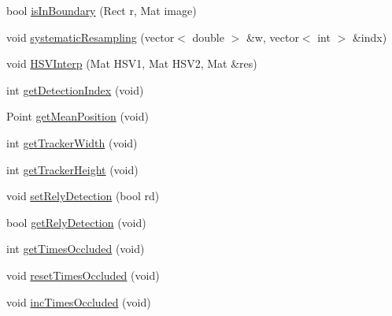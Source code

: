 \begin{DoxyCompactItemize}
\item 
bool \hyperlink{classParticleFilter_a6a0dc76f01919eb2eced75ba0092d69d}{is\-In\-Boundary} (Rect r, Mat image)
\item 
void \hyperlink{classParticleFilter_a3586ef733bc68c6c7c56379ac018a486}{systematic\-Resampling} (vector$<$ double $>$ \&w, vector$<$ int $>$ \&indx)
\item 
void \hyperlink{classParticleFilter_a295b03c569caeb44cb4f6bb19a2c6b59}{H\-S\-V\-Interp} (Mat H\-S\-V1, Mat H\-S\-V2, Mat \&res)
\item 
int \hyperlink{classParticleFilter_acae1f0241299cc95109879173588f62f}{get\-Detection\-Index} (void)
\item 
Point \hyperlink{classParticleFilter_ad102c26410be44ad35abd7b237fca96d}{get\-Mean\-Position} (void)
\item 
int \hyperlink{classParticleFilter_a6e77900524cf6d902285818926e98c57}{get\-Tracker\-Width} (void)
\item 
int \hyperlink{classParticleFilter_ada58fdad64889b721f9347300c28a651}{get\-Tracker\-Height} (void)
\item 
void \hyperlink{classParticleFilter_a8bf63399d1566c933e46917ff8d2218c}{set\-Rely\-Detection} (bool rd)
\item 
bool \hyperlink{classParticleFilter_af33fa2bedc9ca22ad4ee2caba29468e0}{get\-Rely\-Detection} (void)
\item 
int \hyperlink{classParticleFilter_a3f4e7d132dd02967256b15d32e12b165}{get\-Times\-Occluded} (void)
\item 
void \hyperlink{classParticleFilter_a538bf422aad5ea4eb42fb766cd15831c}{reset\-Times\-Occluded} (void)
\item 
void \hyperlink{classParticleFilter_acc2dee02554e66ef0b26eb11f5a32d04}{inc\-Times\-Occluded} (void)
\end{DoxyCompactItemize}
